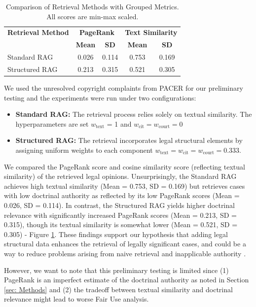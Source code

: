 \begin{table}[ht]
  \centering
  \caption{Comparison of Retrieval Methods with Grouped Metrics. All scores are min-max scaled.}
  \label{tab:grouped_retrieval_comparison}
  \begin{tabular}{l cc | cc}
  \toprule
  \textbf{Retrieval Method} & \multicolumn{2}{c}{\textbf{PageRank}} & \multicolumn{2}{c}{\textbf{Text Similarity}} \\
  \cmidrule(r){2-3} \cmidrule(l){4-5}
                            & \textbf{Mean}    & \textbf{SD}    & \textbf{Mean}      & \textbf{SD}      \\
  \midrule
  Standard RAG    & 0.026 & 0.114 & 0.753 & 0.169 \\
  Structured RAG  & 0.213 & 0.315 & 0.521 & 0.305 \\
  \bottomrule
  \end{tabular}
  \end{table}
  

We used the unresolved copyright complaints from PACER for our preliminary testing and the experiments were run under two configurations:

\begin{itemize}
  \item \textbf{Standard RAG:} The retrieval process relies solely on textual similarity. The hyperparameters are set \(w_{\text{text}}\) = 1 and \(w_{\text{cit}} = w_{\text{court}}= 0\)
  \item \textbf{Structured RAG:} The retrieval incorporates legal structural elements by assigning uniform weights to each component \(w_{\text{text}} = w_{\text{cit}} = w_{\text{court}} = 0.333\).
\end{itemize}
  
We compared the PageRank score and cosine similarity score (reflecting textual similarity) of the retrieved legal opinions. Unsurprisingly, the Standard RAG achieves high textual similarity (Mean = 0.753, SD = 0.169) but retrieves cases with low doctrinal authority as reflected by its low PageRank scores (Mean = 0.026, SD = 0.114). In contrast, the Structured RAG yields higher doctrinal relevance with significantly increased PageRank scores (Mean = 0.213, SD = 0.315), though its textual similarity is somewhat lower (Mean = 0.521, SD = 0.305) - Figure \ref{tab:grouped_retrieval_comparison}. These findings support our hypothesis that adding legal structural data enhances the retrieval of legally significant cases, and could be a way to reduce problems arising from naive retrieval and inapplicable authority \cite{04b_HallucinationFree}.

However, we want to note that this preliminary testing is limited since (1) PageRank is an imperfect estimate of the doctrinal authority as noted in Section \ref{sec: Methods} and (2) the tradeoff between textual similarity and doctrinal relevance might lead to worse Fair Use analysis.
